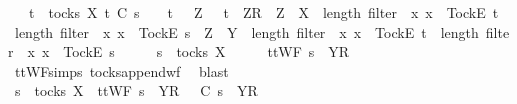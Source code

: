 \begin{isabellebody}
\ \ {\isacharparenleft}{\isasymexists}\ t\ {\isasymin}\ tocks\ X{\isachardot}\ t\ {\isasymlesssim}\isactrlsub C\ s\ {\isasymand}\ {\isacharparenleft}{\isasymrho}\ {\isacharequal}\ t\ {\isasymor}\ {\isacharparenleft}{\isasymexists}\ Z{\isachardot}\ {\isasymrho}\ {\isacharequal}\ t\ {\isacharat}\ {\isacharbrackleft}{\isacharbrackleft}Z{\isacharbrackright}\isactrlsub R{\isacharbrackright}\ {\isasymand}\ {\isacharparenleft}{\isacharparenleft}Z\ {\isasymsubseteq}\ X\ {\isasymand}\ length\ {\isacharparenleft}filter\ {\isacharparenleft}{\isasymlambda}\ x{\isachardot}\ x\ {\isacharequal}\ {\isacharbrackleft}Tock{\isacharbrackright}\isactrlsub E{\isacharparenright}\ t{\isacharparenright}\ {\isacharless}\ length\ {\isacharparenleft}filter\ {\isacharparenleft}{\isasymlambda}\ x{\isachardot}\ x\ {\isacharequal}\ {\isacharbrackleft}Tock{\isacharbrackright}\isactrlsub E{\isacharparenright}\ s{\isacharparenright}{\isacharparenright}\ {\isasymor}\ {\isacharparenleft}Z\ {\isasymsubseteq}\ Y\ {\isasymand}\ length\ {\isacharparenleft}filter\ {\isacharparenleft}{\isasymlambda}\ x{\isachardot}\ x\ {\isacharequal}\ {\isacharbrackleft}Tock{\isacharbrackright}\isactrlsub E{\isacharparenright}\ t{\isacharparenright}\ {\isacharequal}\ length\ {\isacharparenleft}filter\ {\isacharparenleft}{\isasymlambda}\ x{\isachardot}\ x\ {\isacharequal}\ {\isacharbrackleft}Tock{\isacharbrackright}\isactrlsub E{\isacharparenright}\ s{\isacharparenright}{\isacharparenright}{\isacharparenright}{\isacharparenright}{\isacharparenright}{\isacharparenright}{\isachardoublequoteclose}\isanewline
%
\isadelimproof
%
\endisadelimproof
%
\isatagproof
{}\isamarkupfalse%
\ {\isacharminus}\isanewline
\ \ \isamarkupfalse%
\ {\isachardoublequoteopen}s\ {\isasymin}\ tocks\ X{\isachardoublequoteclose}\isanewline
\ \ \isamarkupfalse%
\ \isamarkupfalse%
\ {\isachardoublequoteopen}ttWF\ {\isacharparenleft}s\ {\isacharat}\ {\isacharbrackleft}{\isacharbrackleft}Y{\isacharbrackright}\isactrlsub R{\isacharbrackright}{\isacharparenright}{\isachardoublequoteclose}\isanewline
\ \ \ \ \isamarkupfalse%
\ ttWF{\isachardot}simps{\isacharparenleft}{}{\isacharparenright}\ tocks{\isacharunderscore}append{\isacharunderscore}wf\ \isamarkupfalse%
\ blast\isanewline
\ \ \isamarkupfalse%
\ \isamarkupfalse%
\ {\isachardoublequoteopen}s\ {\isasymin}\ tocks\ X\ {\isasymlongrightarrow}\ ttWF\ {\isacharparenleft}s\ {\isacharat}\ {\isacharbrackleft}{\isacharbrackleft}Y{\isacharbrackright}\isactrlsub R{\isacharbrackright}{\isacharparenright}\ {\isasymlongrightarrow}\ {\isasymrho}\ {\isasymlesssim}\isactrlsub C\ s\ {\isacharat}\ {\isacharbrackleft}{\isacharbrackleft}Y{\isacharbrackright}\isactrlsub R{\isacharbrackright}\ {\isasymlongrightarrow}\ \isanewline

\end{isabellebody}
